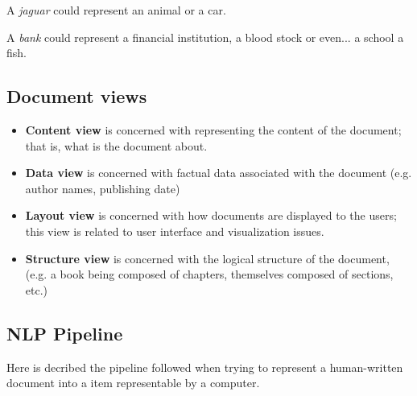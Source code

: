 A {\it jaguar} could represent an animal or a car.

A {\it bank} could represent a financial institution, a blood stock or even... a school a fish.

\subsection{Document views}

\begin{itemize}
	\item {\bf Content view} is concerned with representing the content of the document; that is, what is the document about.
	\item {\bf Data view}  is concerned with factual data associated with the document (e.g. author names, publishing date)
	\item {\bf Layout view} is concerned with how documents are displayed to the users; this view is related to user interface and visualization issues.
	\item {\bf Structure view} is concerned with the logical structure of the document, (e.g. a book being composed of chapters, themselves composed of sections, etc.)
\end{itemize}


\subsection{NLP Pipeline}

Here is decribed the pipeline followed when trying to represent a human-written document into a item representable by a computer.

